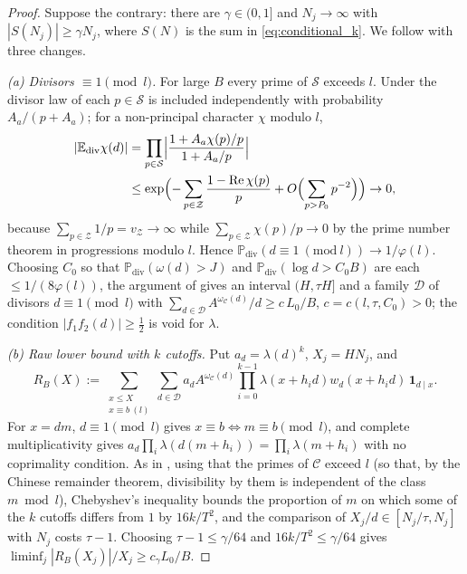 \begin{proof}
Suppose the contrary: there are $\gamma\in(0,1]$ and $N_j\to\infty$ with $|S(N_j)|\ge\gamma N_j$, where $S(N)$ is the sum in \eqref{eq:conditional_k}. We follow \cite[\S11]{OpenAI2026} with three changes.

\emph{(a) Divisors $\equiv1\pmod l$.} For large $B$ every prime of $\mathcal S$ exceeds $l$. Under the divisor law of \cite[proof of Lemma~11.2]{OpenAI2026} each $p\in\mathcal S$ is included independently with probability $A_a/(p+A_a)$; for a non-principal character $\chi$ modulo $l$,
\begin{equation}
\begin{aligned}
|\mathbb E_{\mathrm{div}}\chi(d)|&=\prod_{p\in\mathcal S}\Bigl|\frac{1+A_a\chi(p)/p}{1+A_a/p}\Bigr|\\
&\le\exp\Bigl(-\sum_{p\in\mathcal Z}\frac{1-\mathrm{Re}\,\chi(p)}{p}+O\Bigl(\sum_{p>P_0}p^{-2}\Bigr)\Bigr)\to0,
\end{aligned}
\label{eq:char_div}
\end{equation}
because $\sum_{p\in\mathcal Z}1/p=v_{\mathcal Z}\to\infty$ while $\sum_{p\in\mathcal Z}\chi(p)/p\to0$ by the prime number theorem in progressions modulo $l$. Hence $\mathbb P_{\mathrm{div}}(d\equiv1\ (\mathrm{mod}\ l))\to1/\varphi(l)$. Choosing $C_0$ so that $\mathbb P_{\mathrm{div}}(\omega(d)>J)$ and $\mathbb P_{\mathrm{div}}(\log d>C_0B)$ are each $\le1/(8\varphi(l))$, the argument of \cite[Lemma~11.2]{OpenAI2026} gives an interval $(H,\tau H]$ and a family $\mathcal D$ of divisors $d\equiv1\pmod l$ with $\sum_{d\in\mathcal D}A^{\omega_{\mathcal C}(d)}/d\ge c\,L_0/B$, $c=c(l,\tau,C_0)>0$; the condition $|f_1f_2(d)|\ge\frac12$ is void for $\lambda$.

\emph{(b) Raw lower bound with $k$ cutoffs.} Put $a_d=\lambda(d)^k$, $X_j=HN_j$, and
\begin{equation}
R_B(X):=\sum_{\substack{x\le X\\ x\equiv b\ (l)}}\sum_{d\in\mathcal D}a_dA^{\omega_{\mathcal C}(d)}\prod_{i=0}^{k-1}\lambda(x+h_id)w_d(x+h_id)\,\mathbf 1_{d\mid x}.
\label{eq:RB_k}
\end{equation}
For $x=dm$, $d\equiv1\pmod l$ gives $x\equiv b\iff m\equiv b\pmod l$, and complete multiplicativity gives $a_d\prod_i\lambda(d(m+h_i))=\prod_i\lambda(m+h_i)$ with no coprimality condition. As in \cite[proof of Lemma~11.3]{OpenAI2026}, using that the primes of $\mathcal C$ exceed $l$ (so that, by the Chinese remainder theorem, divisibility by them is independent of the class $m\bmod l$), Chebyshev's inequality bounds the proportion of $m$ on which some of the $k$ cutoffs differs from $1$ by $16k/T^2$, and the comparison of $X_j/d\in[N_j/\tau,N_j]$ with $N_j$ costs $\tau-1$. Choosing $\tau-1\le\gamma/64$ and $16k/T^2\le\gamma/64$ gives $\liminf_j|R_B(X_j)|/X_j\ge c_\gamma L_0/B$.


\end{proof}

